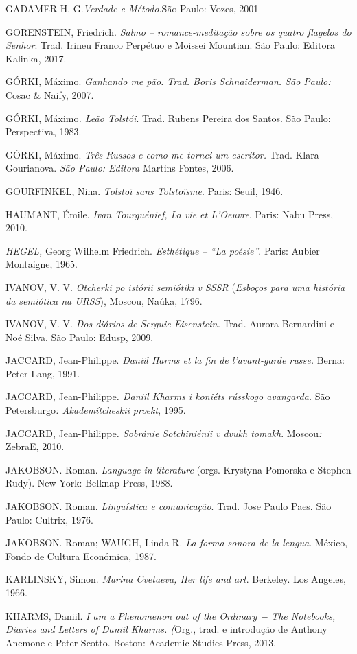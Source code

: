 {{{GADAMER H. G.\emph{Verdade e Método.}São Paulo: Vozes, 2001

GORENSTEIN, Friedrich. \emph{Salmo -- romance-meditação sobre os quatro
flagelos do Senhor}. Trad. Irineu Franco Perpétuo e Moissei Mountian.
São Paulo: Editora Kalinka, 2017.

GÓRKI, Máximo. \emph{Ganhando me pão. Trad. Boris Schnaiderman. São
Paulo:} Cosac \& Naify, 2007.

GÓRKI, Máximo\emph{. Leão Tolstói}. Trad. Rubens Pereira dos Santos. São
Paulo: Perspectiva, 1983.

GÓRKI, Máximo. \emph{Três Russos e como me tornei um escritor.} Trad.
Klara Gourianova. \emph{São Paulo: Editora} Martins Fontes, 2006.

GOURFINKEL, Nina. \emph{Tolstoï sans Tolstoïsme}. Paris: Seuil, 1946.

HAUMANT, Émile. \emph{Ivan Tourguénief, La vie et L'Oeuvre}. Paris: Nabu
Press, 2010.

\emph{HEGEL,} Georg Wilhelm Friedrich. \emph{Esthétique -- ``La
poésie''}. Paris: Aubier Montaigne, 1965.

IVANOV, V. V. \emph{Otcherki po istórii semiótiki v SSSR} (\emph{Esboços
para uma história da semiótica na URSS}), Moscou, Naúka, 1796.

IVANOV, V. V. \emph{Dos diários de Serguie Eisenstein.} Trad. Aurora
Bernardini e Noé Silva. São Paulo: Edusp, 2009.

JACCARD, Jean-Philippe. \emph{Daniil Harms et la fin de l'avant-garde
russe.} Berna: Peter Lang, 1991.

JACCARD, Jean-Philippe\emph{. Daniil Kharms i koniéts rússkogo
avangarda.} São Petersburgo\emph{: Akademítcheskii proekt}, 1995.

JACCARD, Jean-Philippe\emph{. Sobránie Sotchiniénii v dvukh tomakh}.
Moscou\emph{:} ZebraE, 2010.

JAKOBSON. Roman. \emph{Language in literature} (orgs. Krystyna Pomorska
e Stephen Rudy). New York: Belknap Press, 1988.

JAKOBSON. Roman. \emph{Linguística e comunicação}. Trad. Jose Paulo
Paes. São Paulo: Cultrix, 1976.

JAKOBSON. Roman; WAUGH, Linda R\emph{. La forma sonora de la lengua}.
México, Fondo de Cultura Económica, 1987.

KARLINSKY, Simon. \emph{Marina Cvetaeva, Her life and art}. Berkeley.
Los Angeles, 1966.

KHARMS, Daniil. \emph{I am a Phenomenon out of the Ordinary − The
Notebooks, Diaries and Letters of Daniil Kharms. (}Org., trad. e
introdução de Anthony Anemone e Peter Scotto. Boston: Academic Studies
Press, 2013.

}}}
